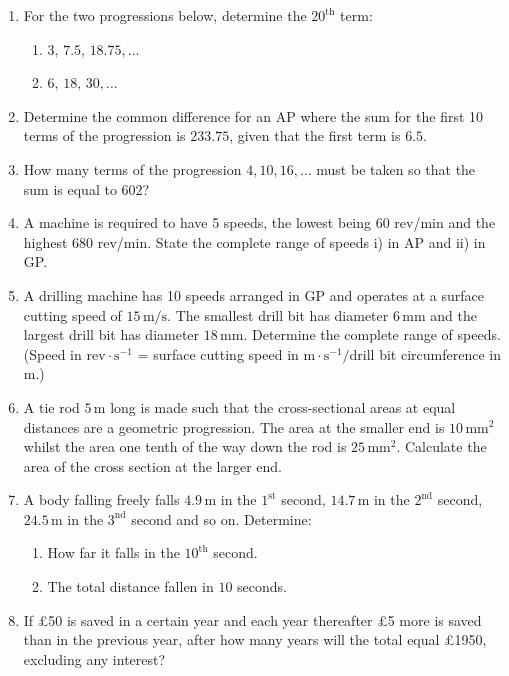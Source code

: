 \documentclass[
  12pt,
  oneside]{book}
\providecommand{\tightlist}{%
  \setlength{\itemsep}{0pt}\setlength{\parskip}{0pt}}
\theoremstyle{definition}
\theoremstyle{definition}
\theoremstyle{definition}
\theoremstyle{definition}
\theoremstyle{remark}
\begin{document}
\begin{enumerate}
\def\labelenumi{\arabic{enumi}.}
\item
  For the two progressions below, determine the \(20^{\mathrm{th}}\) term:

  \begin{enumerate}
  \def\labelenumii{\roman{enumii})}
  \tightlist
  \item
    \(3,\,7.5,\,18.75,\dots\)
  \item
    \(6,\,18,\,30,\dots\)
  \end{enumerate}
\item
  Determine the common difference for an AP where the sum for the first 10 terms of the progression is \(233.75\), given that the first term is \(6.5\).
\item
  How many terms of the progression \(4,10,16,\dots\) must be taken so that the sum is equal to \(602\)?
\item
  A machine is required to have 5 speeds, the lowest being 60 rev/min and the highest 680 rev/min. State the complete range of speeds i) in AP and ii) in GP.
\item
  A drilling machine has 10 speeds arranged in GP and operates at a surface cutting speed of \(15\,\mathrm{m/s}\). The smallest drill bit has diameter \(6\,\mathrm{mm}\) and the largest drill bit has diameter \(18\,\mathrm{mm}\). Determine the complete range of speeds. (Speed in \(\mathrm{rev}\cdot\mathrm{s}^{-1}\) = surface cutting speed in \(\mathrm{m}\cdot\mathrm{s}^{-1}/\)drill bit circumference in \(\mathrm{m}\).)
\item
  A tie rod \(5\,\mathrm{m}\) long is made such that the cross-sectional areas at equal distances are a geometric progression. The area at the smaller end is \(10\,\mathrm{mm}^2\) whilst the area one tenth of the way down the rod is \(25\,\mathrm{mm}^2\). Calculate the area of the cross section at the larger end.
\item
  A body falling freely falls \(4.9\,\mathrm{m}\) in the \(1^{\mathrm{st}}\) second, \(14.7\,\mathrm{m}\) in the \(2^{\mathrm{nd}}\) second, \(24.5\,\mathrm{m}\) in the \(3^{\mathrm{nd}}\) second and so on. Determine:

  \begin{enumerate}
  \def\labelenumii{\alph{enumii})}
  \tightlist
  \item
    How far it falls in the \(10^{\mathrm{th}}\) second.
  \item
    The total distance fallen in \(10\) seconds.
  \end{enumerate}
\item
  If £50 is saved in a certain year and each year thereafter £5 more is saved than in the previous year, after how many years will the total equal £1950, excluding any interest?
\end{enumerate}
\end{document}
